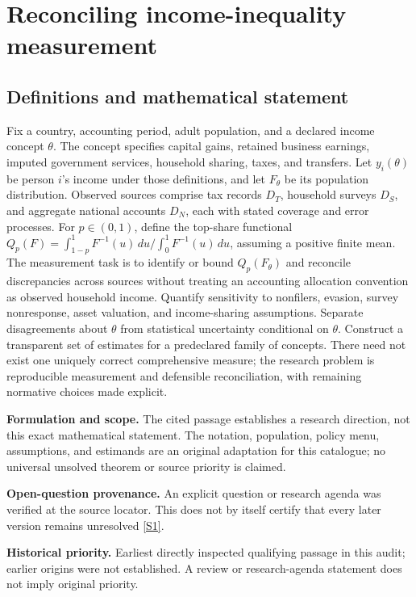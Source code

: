 \documentclass[11pt]{article}
\newcommand{\sref}[2]{\hyperlink{source:#1:#2}{[S#2]}}
\begin{document}
\section*{Reconciling income-inequality measurement}\label{30007642}
\subsection{Definitions and mathematical statement}
Fix a country, accounting period, adult population, and a declared income concept \(\theta\). The concept specifies capital gains, retained business earnings, imputed government services, household sharing, taxes, and transfers. Let \(y_i(\theta)\) be person \(i\)'s income under those definitions, and let \(F_\theta\) be its population distribution. Observed sources comprise tax records \(D_T\), household surveys \(D_S\), and aggregate national accounts \(D_N\), each with stated coverage and error processes. For \(p\in(0,1)\), define the top-share functional \(Q_p(F)=\int_{1-p}^{1}F^{-1}(u)\,du/\int_0^1F^{-1}(u)\,du\), assuming a positive finite mean. The measurement task is to identify or bound \(Q_p(F_\theta)\) and reconcile discrepancies across sources without treating an accounting allocation convention as observed household income. Quantify sensitivity to nonfilers, evasion, survey nonresponse, asset valuation, and income-sharing assumptions. Separate disagreements about \(\theta\) from statistical uncertainty conditional on \(\theta\). Construct a transparent set of estimates for a predeclared family of concepts. There need not exist one uniquely correct comprehensive measure; the research problem is reproducible measurement and defensible reconciliation, with remaining normative choices made explicit.

\par\textbf{Formulation and scope.} The cited passage establishes a research direction, not this exact mathematical statement. The notation, population, policy menu, assumptions, and estimands are an original adaptation for this catalogue; no universal unsolved theorem or source priority is claimed.

\par\textbf{Open-question provenance.} An explicit question or research agenda was verified at the source locator. This does not by itself certify that every later version remains unresolved \sref{30007642}{1}.

\par\textbf{Historical priority.} Earliest directly inspected qualifying passage in this audit; earlier origins were not established. A review or research-agenda statement does not imply original priority.
\end{document}
